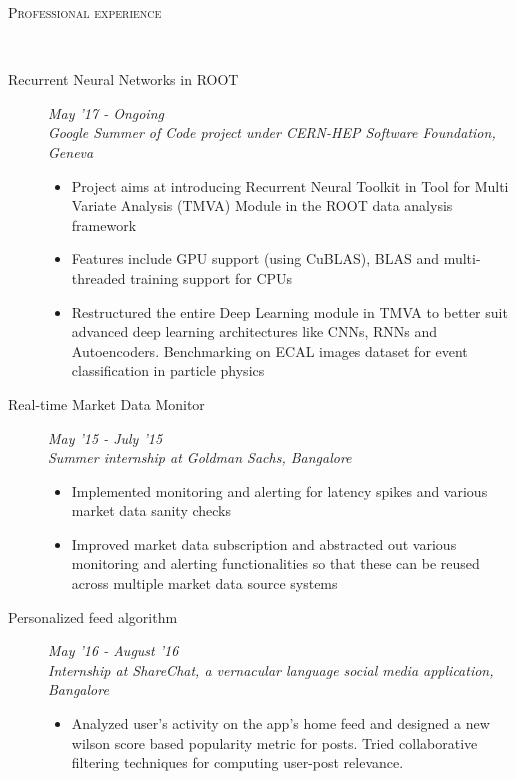 \documentclass[9pt]{article}
\newenvironment{changemargin}[2]{%
  \begin{list}{}{%
    \setlength{\topsep}{0pt}%
    \setlength{\leftmargin}{#1}%
    \setlength{\rightmargin}{#2}%
    \setlength{\listparindent}{\parindent}%
    \setlength{\itemindent}{\parindent}%
    \setlength{\parsep}{\parskip}%
  }%
  \item[]}{\end{list}
}
\newcommand{\lineover}{
	\begin{changemargin}{-0.05in}{-0.10in}
		\vspace*{-9pt}
		\hrulefill \\
		\vspace*{-2pt}
	\end{changemargin}
}
\newcommand{\header}[1]{
	\begin{changemargin}{-0.5in}{-0.5in}
		\scshape{#1}\\
  	\lineover
	\end{changemargin}
}
\newenvironment{body} {
	\vspace*{-16pt}
	\begin{changemargin}{-0.6in}{-0.65in}
  }	
	{\end{changemargin}
}
\begin{document}
\header{Professional experience}
\begin{body}
 \vspace{14pt}

  \begin{description}
  	
  \item[\normalsize{Recurrent Neural Networks in ROOT}] \hfill \textit{May '17 - Ongoing} \\
  \textit{Google Summer of Code project under CERN-HEP Software Foundation, Geneva}
  \begin{itemize}
  	\item Project aims at introducing Recurrent Neural Toolkit in Tool for Multi Variate Analysis (TMVA) Module in the ROOT data analysis framework 
   \item Features include GPU support (using CuBLAS), BLAS and multi-threaded training
   support for CPUs
   \item Restructured the entire Deep Learning module in TMVA to better suit advanced deep learning architectures like CNNs, RNNs and Autoencoders. Benchmarking on ECAL images dataset for event classification in particle physics
  \end{itemize}
    	
  \item[\normalsize{Real-time Market Data Monitor}] \hfill \textit{May '15 - July '15} \\
  \textit{Summer internship at Goldman Sachs, Bangalore} 
  \begin{itemize}
   \item Implemented monitoring and alerting for latency spikes and various market data sanity checks
   \item Improved market data subscription and abstracted out various monitoring and alerting functionalities so that these can be reused across multiple market data source systems
  \end{itemize}
 
   \item [\normalsize{Personalized feed algorithm}] \hfill \textit{May '16 - August '16} \\
   \textit{Internship at ShareChat, a vernacular language social media application, Bangalore} \\
    \begin{itemize}
 	 \item Analyzed user's activity on the app's home feed and designed a new wilson 	score based popularity metric for posts. Tried collaborative filtering techniques 
	  for computing user-post relevance.
    \end{itemize}
  \end{description}
  
\end{body}
\end{document}
